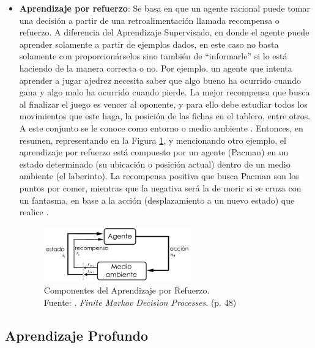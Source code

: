 \begin{itemize}
	\item \textbf{Aprendizaje por refuerzo}: Se basa en que un agente racional puede tomar una decisión a partir de una retroalimentación llamada recompensa o refuerzo. A diferencia del Aprendizaje Supervisado, en donde el agente puede aprender solamente a partir de ejemplos dados, en este caso no basta solamente con proporcionárselos sino también de “informarle” si lo está haciendo de la manera correcta o no. Por ejemplo, un agente que intenta aprender a jugar ajedrez necesita saber que algo bueno ha ocurrido cuando gana y algo malo ha ocurrido cuando pierde. La mejor recompensa que busca al finalizar el juego es vencer al oponente, y para ello debe estudiar todos los movimientos que este haga, la posición de las fichas en el tablero, entre otros. A este conjunto se le conoce como entorno o medio ambiente \parencite{bk_russell2004intart}. Entonces, en resumen, representando en la Figura \ref{2:fig4}, y mencionando otro ejemplo, el aprendizaje por refuerzo está compuesto por un agente (Pacman) en un estado determinado (su ubicación o posición actual) dentro de un medio ambiente (el laberinto). La recompensa positiva que busca Pacman son los puntos por comer, mientras que la negativa será la de morir si se cruza con un fantasma, en base a la acción (desplazamiento a un nuevo estado) que realice \parencite{tec_merino2019aprendrefuerzo}.
	\begin{figure}[h]
		\begin{center}
			\includegraphics[width=0.60\textwidth]{2/figures/aprendizaje_refuerzo.jpg}
			\caption[Componentes del Aprendizaje por Refuerzo]{Componentes del Aprendizaje por Refuerzo.\\
			Fuente: \cite{bk_sutton2018rl}. \textit{Finite Markov Decision Processes}. (p. 48)}
			\label{2:fig4}
		\end{center}
	\end{figure}
\end{itemize}

\clearpage

\subsection{Aprendizaje Profundo}

